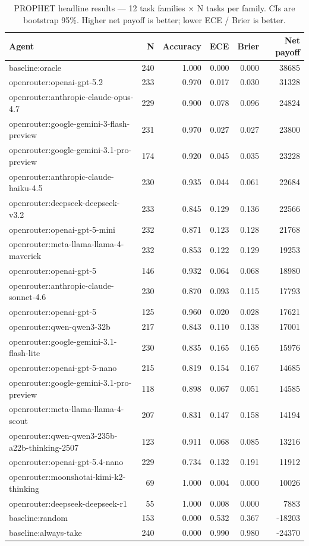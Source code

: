 \begin{table}[t]
\centering\small
\caption{PROPHET headline results --- 12 task families $\times$ N tasks per family. CIs are bootstrap 95\%. Higher net payoff is better; lower ECE / Brier is better.}\label{tab:headline}
\begin{tabular}{lrrrrr}
\toprule
Agent & N & Accuracy & ECE & Brier & Net payoff \\
\midrule
baseline:oracle & 240 & 1.000 & 0.000 & 0.000 & 38685 \\
openrouter:openai-gpt-5.2 & 233 & 0.970 & 0.017 & 0.030 & 31328 \\
openrouter:anthropic-claude-opus-4.7 & 229 & 0.900 & 0.078 & 0.096 & 24824 \\
openrouter:google-gemini-3-flash-preview & 231 & 0.970 & 0.027 & 0.027 & 23800 \\
openrouter:google-gemini-3.1-pro-preview & 174 & 0.920 & 0.045 & 0.035 & 23228 \\
openrouter:anthropic-claude-haiku-4.5 & 230 & 0.935 & 0.044 & 0.061 & 22684 \\
openrouter:deepseek-deepseek-v3.2 & 233 & 0.845 & 0.129 & 0.136 & 22566 \\
openrouter:openai-gpt-5-mini & 232 & 0.871 & 0.123 & 0.128 & 21768 \\
openrouter:meta-llama-llama-4-maverick & 232 & 0.853 & 0.122 & 0.129 & 19253 \\
openrouter:openai-gpt-5 & 146 & 0.932 & 0.064 & 0.068 & 18980 \\
openrouter:anthropic-claude-sonnet-4.6 & 230 & 0.870 & 0.093 & 0.115 & 17793 \\
openrouter:openai-gpt-5 & 125 & 0.960 & 0.020 & 0.028 & 17621 \\
openrouter:qwen-qwen3-32b & 217 & 0.843 & 0.110 & 0.138 & 17001 \\
openrouter:google-gemini-3.1-flash-lite & 230 & 0.835 & 0.165 & 0.165 & 15976 \\
openrouter:openai-gpt-5-nano & 215 & 0.819 & 0.154 & 0.167 & 14685 \\
openrouter:google-gemini-3.1-pro-preview & 118 & 0.898 & 0.067 & 0.051 & 14585 \\
openrouter:meta-llama-llama-4-scout & 207 & 0.831 & 0.147 & 0.158 & 14194 \\
openrouter:qwen-qwen3-235b-a22b-thinking-2507 & 123 & 0.911 & 0.068 & 0.085 & 13216 \\
openrouter:openai-gpt-5.4-nano & 229 & 0.734 & 0.132 & 0.191 & 11912 \\
openrouter:moonshotai-kimi-k2-thinking & 69 & 1.000 & 0.004 & 0.000 & 10026 \\
openrouter:deepseek-deepseek-r1 & 55 & 1.000 & 0.008 & 0.000 & 7883 \\
baseline:random & 153 & 0.000 & 0.532 & 0.367 & -18203 \\
baseline:always-take & 240 & 0.000 & 0.990 & 0.980 & -24370 \\
\bottomrule
\end{tabular}
\end{table}